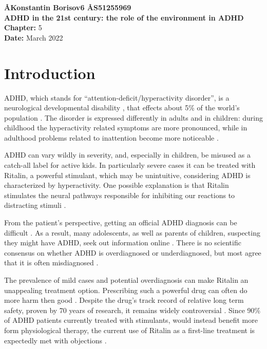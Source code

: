 \documentclass[a4paper,11pt]{article}
\begin{document}
  \begin{singlespace}
    \large
    {\bf \AA{Konstantin Borisov}{6} \AA{S5125596}{9}} \\[12pt]
    {\huge\bf ADHD in the 21st century: the role of the environment in ADHD} \\[6pt]
    \textbf{Chapter:} 5 \\
    \textbf{Date:} March 2022
  \end{singlespace}
  \vspace{-\parskip}

  \section{Introduction}
  ADHD, which stands for ``attention-deficit/hyperactivity disorder'',
  is a neurological developmental disability \cite{adolescents},
  that effects about 5\% of the world's population \cite{underdiagnosis}.
  The disorder is expressed differently in adults and in children:
  during childhood the hyperactivity related symptoms are more pronounced,
  while in adulthood problems related to inattention become more noticeable \cite{underdiagnosis}.

  ADHD can vary wildly in severity, and, especially in children, be misused as a catch-all label for active kids.
  In particularly severe cases it can be treated with Ritalin, a powerful stimulant,
  which may be unintuitive, considering ADHD is characterized by hyperactivity.
  One possible explanation is that Ritalin stimulates the neural pathways responsible for
  inhibiting our reactions to distracting stimuli \cite{thebook}.

  From the patient's perspective, getting an official ADHD diagnosis can be difficult \cite{diagnosisdifficulty}.
  As a result, many adolescents, as well as parents of children, suspecting they might have ADHD,
  seek out information online \cite{informationseeking}.
  There is no scientific consensus on whether ADHD is overdiagnosed or underdiagnosed,
  but most agree that it is often misdiagnosed \cite{overorunderdiagnosed}.

  The prevalence of mild cases and potential overdiagnosis can make Ritalin an unappealing treatment option.
  Prescribing such a powerful drug can often do more harm then good \cite{thebook}.
  Despite the drug's track record of relative long term safety, proven by 70 years of research,
  it remains widely controversial \cite{controversy}.
  Since 90\% of ADHD patients currently treated with stimulants,
  would instead benefit more form physiological therapy,
  the current use of Ritalin as a first-line treatment is expectedly met with objections \cite{controversy}.
\end{document}
